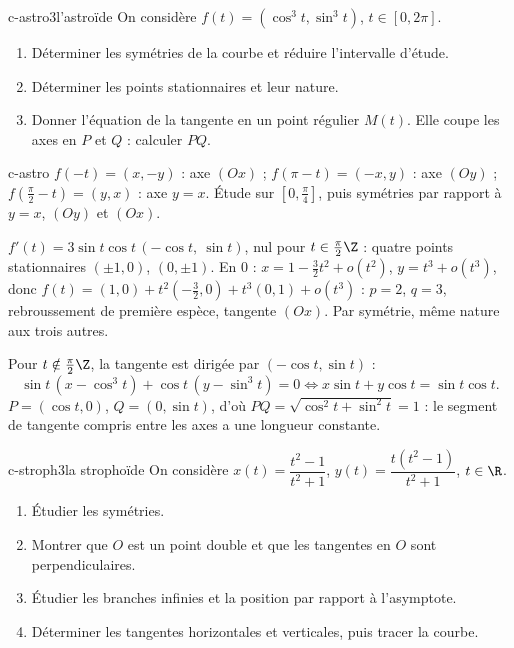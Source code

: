 \begin{exo}{c-astro}{3}{l'astroïde}
On considère $f(t)=(\cos^3t,\sin^3t)$, $t\in[0,2\pi]$.
\begin{enumerate}
\item Déterminer les symétries de la courbe et réduire l'intervalle d'étude.
\item Déterminer les points stationnaires et leur nature.
\item Donner l'équation de la tangente en un point régulier $M(t)$. Elle coupe les axes en $P$ et $Q$ : calculer $PQ$.
\end{enumerate}
\end{exo}

\begin{corrige}{c-astro}
 $f(-t)=(x,-y)$ : axe $(Ox)$ ; $f(\pi-t)=(-x,y)$ : axe $(Oy)$ ; $f\left(\frac\pi2-t\right)=(y,x)$ : axe $y=x$. Étude sur $\left[0,\frac\pi4\right]$, puis symétries par rapport à $y=x$, $(Oy)$ et $(Ox)$.

 $f'(t)=3\sin t\cos t\,(-\cos t,\ \sin t)$, nul pour $t\in\frac\pi2\Z$ : quatre points stationnaires $(\pm1,0)$, $(0,\pm1)$. En $0$ : $x=1-\frac32t^2+o(t^2)$, $y=t^3+o(t^3)$, donc $f(t)=(1,0)+t^2\left(-\frac32,0\right)+t^3(0,1)+o(t^3)$ : $p=2$, $q=3$, rebroussement de première espèce, tangente $(Ox)$. Par symétrie, même nature aux trois autres.

 Pour $t\notin\frac\pi2\Z$, la tangente est dirigée par $(-\cos t,\sin t)$ :
\[\sin t\,(x-\cos^3t)+\cos t\,(y-\sin^3t)=0\iff x\sin t+y\cos t=\sin t\cos t.\]
$P=(\cos t,0)$, $Q=(0,\sin t)$, d'où $PQ=\sqrt{\cos^2t+\sin^2t}=1$ : le segment de tangente compris entre les axes a une longueur constante.
\end{corrige}

\begin{exo}{c-stroph}{3}{la strophoïde}
On considère $x(t)=\dfrac{t^2-1}{t^2+1}$, $y(t)=\dfrac{t(t^2-1)}{t^2+1}$, $t\in\R$.
\begin{enumerate}
\item Étudier les symétries.
\item Montrer que $O$ est un point double et que les tangentes en $O$ sont perpendiculaires.
\item Étudier les branches infinies et la position par rapport à l'asymptote.
\item Déterminer les tangentes horizontales et verticales, puis tracer la courbe.
\end{enumerate}
\end{exo}

